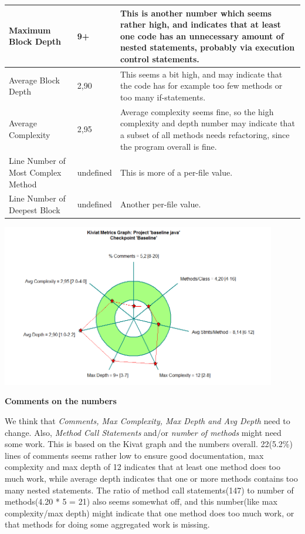 \documentclass{article}
\begin{document}
\begin{tabulary}{1.0\textwidth}{| P{3cm} | P{2.7cm} | p{8.5cm} |}
	Maximum Block Depth & 9+ & This is another number which seems rather high, and 
	indicates that at least one code has an unnecessary amount of nested statements,
	probably via execution control statements.\\ \hline
	Average Block Depth & 2,90 & This seems a bit high, and may indicate that the
	code has for example too few methods or too many if-statements.\\ \hline
	Average Complexity & 2,95 & Average complexity seems fine, so the high complexity
	and depth number may indicate that a subset of all methods needs refactoring, since
	the program overall is fine.\\ \hline
	Line Number of Most Complex Method & undefined & This is more of a per-file value.\\ \hline
	Line Number of Deepest Block & undefined & Another per-file value. \\ \hline
\end{tabulary}
\pagebreak

\includegraphics[width=0.9\textwidth]{Hangman-Kiviat-before.png}

\textbf{Comments on the numbers}\newline

We think that \textit{Comments, Max Complexity, Max Depth and Avg Depth}
need to change. Also, \textit{Method Call Statements} and/or \textit{number of methods} might need some work.
 This is based on the Kivat graph and the numbers overall. 22(5.2\%) lines of comments seems
  rather low to ensure good documentation, max complexity and max depth of 12 indicates that
   at least one method does too much work, while average depth indicates that one or more
    methods contains too many nested statements. The ratio of method call statements(147)
     to number of methods(4.20 * 5 = 21) also seems somewhat off, and this number(like max
      complexity/max depth) might indicate that one method does too much work, or that methods
       for doing some aggregated work is missing.
\end{document}
